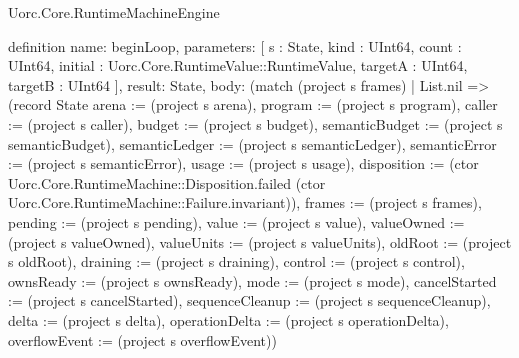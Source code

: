 \begin{lexlean}{Uorc.Core.RuntimeMachineEngine}
\begin{semanticmodule}
definition{
  name: beginLoop,
  parameters: [
    s : State,
    kind : UInt64,
    count : UInt64,
    initial : Uorc.Core.RuntimeValue::RuntimeValue,
    targetA : UInt64,
    targetB : UInt64
  ],
  result: State,
  body: (match (project s frames)
    | List.nil => (record State {arena := (project s arena), program := (project s program), caller := (project s caller), budget := (project s budget), semanticBudget := (project s semanticBudget), semanticLedger := (project s semanticLedger), semanticError := (project s semanticError), usage := (project s usage), disposition := (ctor Uorc.Core.RuntimeMachine::Disposition.failed (ctor Uorc.Core.RuntimeMachine::Failure.invariant)), frames := (project s frames), pending := (project s pending), value := (project s value), valueOwned := (project s valueOwned), valueUnits := (project s valueUnits), oldRoot := (project s oldRoot), draining := (project s draining), control := (project s control), ownsReady := (project s ownsReady), mode := (project s mode), cancelStarted := (project s cancelStarted), sequenceCleanup := (project s sequenceCleanup), delta := (project s delta), operationDelta := (project s operationDelta), overflowEvent := (project s overflowEvent)})
}
\end{semanticmodule}
\end{lexlean}
